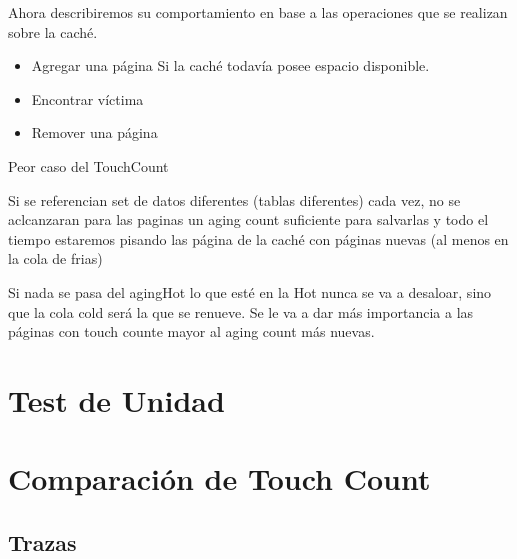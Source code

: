 \documentclass[11pt, a4paper, spanish]{article}
\begin{document}
Ahora describiremos su comportamiento en base a las operaciones que se realizan sobre la cach\'e.

\begin{itemize}
	\item{Agregar una p\'agina
		Si la cach\'e todav\'ia posee espacio disponible.
	}
	\item{Encontrar víctima }
	\item{Remover una p\'agina}
\end{itemize}



Peor caso del TouchCount

Si se referencian set de datos diferentes (tablas diferentes) cada vez, no se aclcanzaran para las paginas un aging count suficiente
para salvarlas y todo el tiempo estaremos pisando las página de la caché con páginas nuevas (al menos en la cola de frias)

Si nada se pasa del agingHot lo que esté en la Hot nunca se va a desaloar, sino que la cola cold será la que se renueve.
Se le va a dar más importancia a las páginas con touch counte mayor al aging count más nuevas.

\newpage
\section{Test de Unidad}

\newpage
\section{Comparaci\'on de Touch Count}

\subsection{Trazas}
\end{document}
